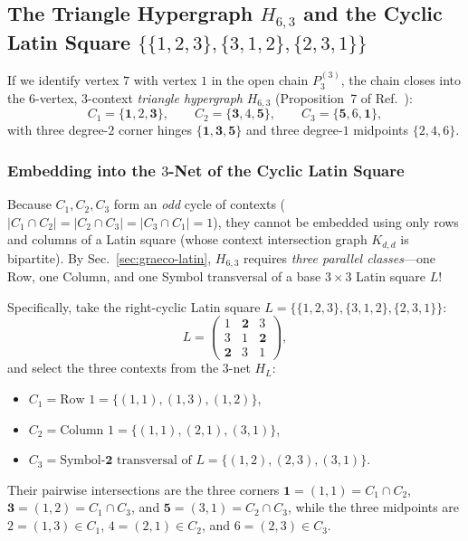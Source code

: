 \documentclass[aps,pra,reprint,superscriptaddress,longbibliography,nofootinbib,floatfix,10pt]{revtex4-2}
\theoremstyle{definition}\newtheorem{definition}[theorem]{Definition}
\theoremstyle{remark}\newtheorem{remark}[theorem]{Remark}
\begin{document}
\subsection{The Triangle Hypergraph \texorpdfstring{$H_{6,3}$}{H6,3} and the Cyclic Latin Square \texorpdfstring{$\{\{1,2,3\},\{3,1,2\},\{2,3,1\}\}$}{{{1,2,3},{3,1,2},{2,3,1}}}}\label{sec:triangle}

If we identify vertex $7$ with vertex $1$ in the open chain $P_3^{(3)}$, the chain closes into the $6$-vertex, $3$-context \emph{triangle hypergraph} $H_{6,3}$ (Proposition~7 of Ref.~\cite{svozil-2025-color}):
\begin{equation}\label{eq:H63}
C_1=\{\mathbf{1},2,\mathbf{3}\},\qquad C_2=\{\mathbf{3},4,\mathbf{5}\},\qquad C_3=\{\mathbf{5},6,\mathbf{1}\},
\end{equation}
with three degree-$2$ corner hinges $\{\mathbf{1},\mathbf{3},\mathbf{5}\}$ and three degree-$1$ midpoints $\{2,4,6\}$.

\subsubsection{Embedding into the \texorpdfstring{$3$}{3}-Net of the Cyclic Latin Square}
Because $C_1,C_2,C_3$ form an \emph{odd} cycle of contexts ($|C_1\cap C_2|=|C_2\cap C_3|=|C_3\cap C_1|=1$), they cannot be embedded using only rows and columns of a Latin square (whose context intersection graph $K_{d,d}$ is bipartite). By Sec.~\ref{sec:graeco-latin}, $H_{6,3}$ requires \emph{three parallel classes}—one Row, one Column, and one Symbol transversal of a base $3\times 3$ Latin square $L$!

Specifically, take the right-cyclic Latin square $L=\{\{1,2,3\},\{3,1,2\},\{2,3,1\}\}$:
\begin{equation}\label{eq:cyclic-L3}
L=\begin{pmatrix}
1 & \mathbf{2} & 3\\
3 & 1 & \mathbf{2}\\
\mathbf{2} & 3 & 1
\end{pmatrix},
\end{equation}
and select the three contexts from the $3$-net $H_L$:
\begin{itemize}
\item $C_1=\text{Row 1}=\{(1,1),(1,3),(1,2)\}$,
\item $C_2=\text{Column 1}=\{(1,1),(2,1),(3,1)\}$,
\item $C_3=\text{Symbol-}\mathbf{2}\text{ transversal of }L=\{(1,2),(2,3),(3,1)\}$.
\end{itemize}
Their pairwise intersections are the three corners $\mathbf{1}=(1,1)=C_1\cap C_2$, $\mathbf{3}=(1,2)=C_1\cap C_3$, and $\mathbf{5}=(3,1)=C_2\cap C_3$, while the three midpoints are $2=(1,3)\in C_1$, $4=(2,1)\in C_2$, and $6=(2,3)\in C_3$.
\end{document}
